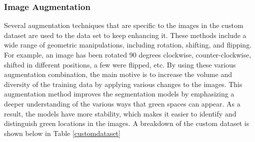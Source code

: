 \subsubsection{Image Augmentation}
Several augmentation techniques that are specific to the images in the custom dataset are used to the data set to keep enhancing it. These methods include a wide range of geometric manipulations, including rotation, shifting, and flipping. For example, an image has been rotated 90 degrees clockwise, counter-clockwise, shifted in different positions, a few were flipped, etc. By using these various augmentation combination, the main motive is to increase the volume and diversity of the training data by applying various changes to the images. This augmentation method improves the segmentation models by emphasizing a deeper understanding of the various ways that green spaces can appear. As a result, the models have more stability, which makes it easier to identify and distinguish green locations in the images. A breakdown of the custom dataset is shown below in Table \ref{customdataset}

 


